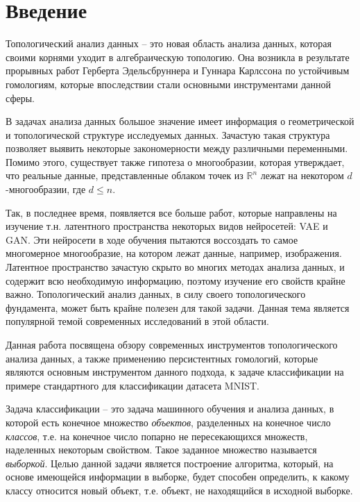 \chapter*{Введение}

Топологический анализ данных -- это новая область анализа данных, которая своими корнями уходит в алгебраическую топологию. Она возникла в результате прорывных работ Герберта Эдельсбруннера \cite{Edelsbrunner et al} и Гуннара Карлссона \cite{Carlsson and Zomorodian} по устойчивым гомологиям, которые впоследствии стали основными инструментами данной сферы. 

В задачах анализа данных большое значение имеет информация о геометрической и топологической структуре исследуемых данных. Зачастую такая структура позволяет выявить некоторые закономерности между различными переменными. Помимо этого, существует также гипотеза о многообразии, которая утверждает, что реальные данные, представленные облаком точек из $\mathbb{R}^n$ лежат на некотором $d$-многообразии, где $d \leq n$. 

Так, в последнее время, появляется все больше работ, которые направлены на изучение т.н. латентного пространства некоторых видов нейросетей: VAE и GAN. Эти нейросети в ходе обучения пытаются воссоздать то самое многомерное многообразие, на котором лежат данные, например, изображения. Латентное пространство зачастую скрыто во многих методах анализа данных, и содержит всю необходимую информацию, поэтому изучение его свойств крайне важно. Топологический анализ данных, в силу своего топологического фундамента, может быть крайне полезен для такой задачи. Данная тема является популярной темой современных исследований в этой области.



Данная работа посвящена обзору современных инструментов топологического анализа данных, а также применению персистентных гомологий, которые являются основным инструментом данного подхода, к задаче классификации на примере стандартного для классификации датасета MNIST.  

Задача классификации -- это задача машинного обучения и анализа данных, в которой есть конечное множество {\it объектов}, разделенных на конечное число {\it классов}, т.е. на конечное число попарно не пересекающихся множеств, наделенных некоторым свойством. Такое заданное множество называется {\it выборкой}. Целью данной задачи является построение алгоритма, который, на основе имеющейся информации в выборке, будет способен определить, к какому классу относится новый объект, т.е. объект, не находящийся в исходной выборке.

